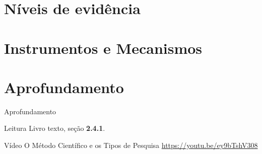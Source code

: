 \documentclass{beamer}
\begin{document}
\section{Níveis de evidência}

\section{Instrumentos e Mecanismos}

\section{Aprofundamento}

\begin{frame}{Aprofundamento}
  \begin{block}{Leitura}
    Livro texto, seção {\bf 2.4.1}.
  \end{block}
  \begin{block}{Vídeo}
    O Método Científico e os Tipos de Pesquisa \href{https://youtu.be/ey9bTshV308}{https://youtu.be/ey9bTshV308}
  \end{block}

\end{frame}






\end{document}
